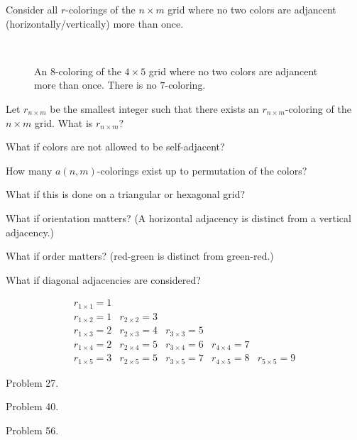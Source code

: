 \documentclass{article}
\begin{document}
Consider all $r$-colorings of the $n \times m$ grid where no two colors
are adjancent (horizontally/vertically) more than once.

\begin{figure}[!h]
  \centering
  \\
  \caption{An $8$-coloring of the $4 \times 5$ grid where no two colors are adjancent
    more than once. There is no $7$-coloring.}
\end{figure}

\begin{question}
  Let $r_{n\times m}$ be the smallest integer such that there exists an
  $r_{n \times m}$-coloring of the $n \times m$ grid. What is $r_{n\times m}$?
\end{question}
\begin{related}
  \item What if colors are not allowed to be self-adjacent?
  \item How many $a(n, m)$-colorings exist up to permutation of the colors?
  \item What if this is done on a triangular or hexagonal grid?
  \item What if orientation matters?
    (A horizontal adjacency is distinct from a vertical adjacency.)
  \item What if order matters? (red-green is distinct from green-red.)
  \item What if diagonal adjacencies are considered?
\end{related}

\begin{note}
  \[
    \begin{array}{ccccc}
      r_{1 \times 1} = 1 \\
      r_{1 \times 2} = 1 & r_{2 \times 2} = 3 \\
      r_{1 \times 3} = 2 & r_{2 \times 3} = 4 & r_{3 \times 3} = 5 \\
      r_{1 \times 4} = 2 & r_{2 \times 4} = 5 & r_{3 \times 4} = 6 & r_{4 \times 4} = 7 \\
      r_{1 \times 5} = 3 & r_{2 \times 5} = 5 & r_{3 \times 5} = 7 & r_{4 \times 5} = 8 & r_{5 \times 5} = 9
    \end{array}
  \]
\end{note}

\begin{references}
  \item Problem 27.
  \item Problem 40.
  \item Problem 56.
\end{references}
\end{document}
